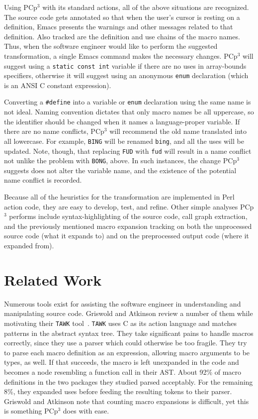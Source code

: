 \documentclass{article}
\newcommand{\pcp}{\mbox{\textsf{PCp}$^3$}}
\newcommand{\Perl}{\mbox{\textsf{Perl}}}
\newcommand{\C}{\mbox{\textsf{C}}}
\newcommand{\ppd}[1]{\texttt{\##1}}
\begin{document}
\noindent Using \pcp{} with its standard actions, all of the above
situations are recognized.  The source code gets annotated so that when
the user's cursor is resting on a definition, Emacs presents the
warnings and other messages related to that definition.  Also tracked
are the definition and use chains of the macro names.  Thus, when the
software engineer would like to perform the suggested transformation, a
single Emacs command makes the necessary changes.  \pcp{} will suggest
using a \texttt{static const int} variable if there are no uses in
array-bounds specifiers, otherwise it will suggest using an anonymous
\texttt{enum} declaration (which is an ANSI \C{} constant expression).

Converting a \ppd{define} into a variable or \texttt{enum} declaration
using the same name is not ideal.  Naming convention dictates that only
macro names be all uppercase, so the identifier should be changed when it
names a language-proper variable.  If there are no name conflicts, \pcp{} will recommend
the old name translated into all lowercase.  For example, \texttt{BING} will be renamed
\texttt{bing}, and all the uses will be updated.  Note, though, that
replacing \texttt{FUD} with \texttt{fud} will result in a name conflict
not unlike the problem with \texttt{BONG}, above.  In such instances,
the change \pcp{} suggests does not alter the variable name, and the
existence of the potential name conflict is recorded.


Because all of the heuristics for the transformation are implemented in
\Perl{} action code, they are easy to develop, test, and refine.  Other
simple analyses \pcp{}  performs include syntax-highlighting of
the source code, call graph extraction, and the previously mentioned
macro expansion tracking on both the unprocessed source code (what it
expands to) and on the preprocessed output code (where it expanded
from).

\section{Related Work}
\label{sec:related}
Numerous tools exist for assisting the software engineer in
understanding and manipulating source code.  Griswold and Atkinson
review a number of them while motivating their \texttt{TAWK} tool~\cite{Griswold96}.
\texttt{TAWK} uses \C{} as its action language and matches patterns in
the abstract syntax tree.  They take significant pains to handle macros
correctly, since they use a parser which could otherwise be too
fragile.  They try to parse each macro definition as an expression,
allowing macro arguments to be types, as well.  If that succeeds, the
macro is left unexpanded in the code and becomes a node resembling a
function call in their AST.  About 92\% of macro definitions in the two packages
they studied parsed acceptably.  For the remaining 8\%, they expanded
uses before feeding the resulting tokens to their parser.  Griswold and
Atkinson note that counting macro expansions is difficult, yet this is
something \pcp{} does with ease.
\end{document}
